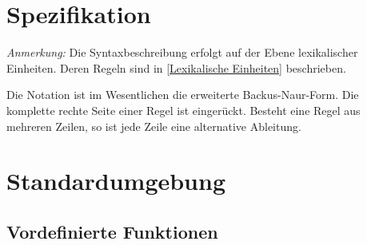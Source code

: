 
\newpage
\section{Spezifikation}

\emph{Anmerkung:} 
Die Syntaxbeschreibung erfolgt auf der Ebene lexikalischer Einheiten. 
Deren Regeln sind in \ref{Lexikalische Einheiten} beschrieben. 

\newcommand\Gspace{\ \ }
\newcommand\Gnt[1]{\emph{#1}}
\newcommand\Gt[1]{`\texttt{#1}'}
\newcommand\Gspecial[1]{#1}
\newcommand\Grange[2]{\Gt{#1} .. \Gt{#2}}
\newcommand\Gopt[1]{[\ #1\ ]}
\newcommand\Galt[1]{( #1 )}
\newcommand\Gor{ | }
\newcommand\attr[1]{\texttt{#1}}
\newcommand\kw[1]{\texttt{#1}}
\newcommand\op[1]{`\texttt{#1}'}
\newcommand\pmbr[1]{\texttt{#1}}
\newcommand\ident[1]{\texttt{#1}}
\newcommand\plus{+}
\newcommand\kwMlcStart{\kw{/*}}
\newcommand\kwMlcEnd{\kw{*/}}

Die Notation ist im Wesentlichen die erweiterte Backus-Naur-Form.
Die komplette rechte Seite einer Regel ist eingerückt. Besteht eine Regel
aus mehreren Zeilen, so ist jede Zeile eine alternative Ableitung.



\section{Standardumgebung}

\subsection{Vordefinierte Funktionen}
\label{builtins}

